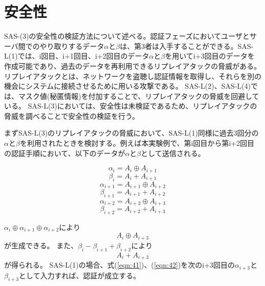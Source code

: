 \documentclass{thesis}
\begin{document}
\section{安全性}
SAS-(3)の安全性の検証方法について述べる。認証フェーズにおいてユーザとサーバ間でのやり取りするデータ$\alpha$と$\beta$は、第3者は入手することができる。SAS-L(1)では、i回目、i+1回目、i+2回目のデータ$\alpha$と$\beta$を用いてi+3回目のデータを作成可能であり、過去のデータを再利用できるリプレイアタックの脅威がある。リプレイアタックとは、ネットワークを盗聴し認証情報を取得し、それらを別の機会にシステムに接続させるために用いる攻撃である\cite{SAS-L IoTに適した認証方式について}。
SAS-L(2)、SAS-L(4)では、マスク値(秘匿情報)を付加することで、リプレイアタックの脅威を回避している\cite{SAS}。 SAS-L(3)においては、安全性は未検証であるため、リプレイアタックの脅威を調べることで安全性の検証を行う。

まずSAS-L(3)のリプレイアタックの脅威において、SAS-L(1)同様に過去3回分の$\alpha$と$\beta$を利用されたときを検討する。例えば本実験例で、第i回目から第i+2回目の認証手順において、以下のデータが$\alpha$と$\beta$として送信される。

\begin{equation}\label{eqn:11}
\alpha_i = A_{i} \oplus A_{i+1} 
\end{equation}
\begin{equation}\label{eqn:12}
\beta_i = A_{i} + A_{i+1} 
\end{equation}
%
\begin{equation}\label{eqn:21}
\alpha_{i+1} = A_{i+1} \oplus A_{i+2} 
\end{equation}
\begin{equation}\label{eqn:22}
\beta_{i+1} = A_{i+1} + A_{i+2} 
\end{equation}
%
\begin{equation}\label{eqn:31}
\alpha_{i+2} = A_{i+2} \oplus A_{i+3} 
\end{equation}
\begin{equation}\label{eqn:32}
\beta_{i+2} = A_{i+2} + A_{i+3} 
\end{equation}

$\alpha_{i} \oplus \alpha_{i+1} \oplus \alpha_{i+2}$により
\begin{equation}\label{eqn:41}
A_{i} \oplus A_{i+3} 
\end{equation}
が生成できる。
また、$\beta_{i} - \beta_{i+1} + \beta_{i+2}$により
\begin{equation}\label{eqn:42}
A_{i} + A_{i+3} 
\end{equation}
が得られる。
SAS-L(1)の場合、式(\ref{eqn:41})、(\ref{eqn:42})を次のi+3回目の$\alpha_{i+3}$と$\beta_{i+3}$として入力すれば、認証が成立する\cite{SAS}。
\end{document}
